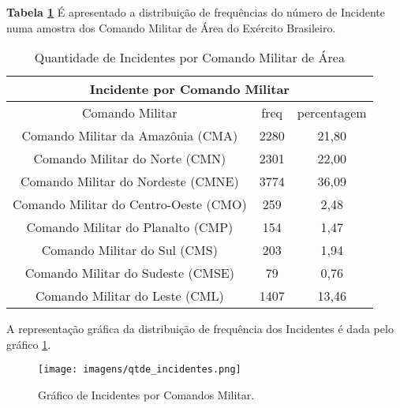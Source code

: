 \hspace{1.5cm}
\textbf{Tabela \ref{QuantidadeIncidentes}} É apresentado a distribuição de frequências do número de Incidente numa amostra dos Comando Militar de Área do Exército Brasileiro. 
\begin{table}[H]
\centering
\begin{tabular}{|c | c| c|} 
 \multicolumn{3}{c}{Incidente por Comando Militar}\\ \hline
  Comando Militar & freq   & percentagem \\ [0.5ex] 
 \hline
 Comando Militar da Amazônia (CMA) & 2280 & 21,80\\ 
 \hline
 Comando Militar do Norte (CMN) &  2301 & 22,00\\
 \hline
 Comando Militar do Nordeste (CMNE) &  3774 & 36,09\\
 \hline
 Comando Militar do Centro-Oeste (CMO) & 259 & 2,48\\
 \hline
 Comando Militar do Planalto (CMP) &  154 & 1,47\\
 \hline
 Comando Militar do Sul (CMS) &  203 & 1,94\\
 \hline
 Comando Militar do Sudeste (CMSE) &  79 & 0,76\\
 \hline
 Comando Militar do Leste (CML) &  1407 & 13,46\\ [1ex] 
 \hline
\end{tabular}
\caption{Quantidade de Incidentes por Comando Militar de Área}
\label{QuantidadeIncidentes}
\end{table}

\hspace{1.5cm}
A representação gráfica da distribuição de frequência dos Incidentes é dada pelo gráfico \ref{figuraIncidentes}.
\begin{figure}[H]
        \centering
        \texttt{[image: imagens/qtde\_incidentes.png]}
        \caption{Gráfico de Incidentes por Comandos Militar.}
        \label{figuraIncidentes}
\end{figure}

